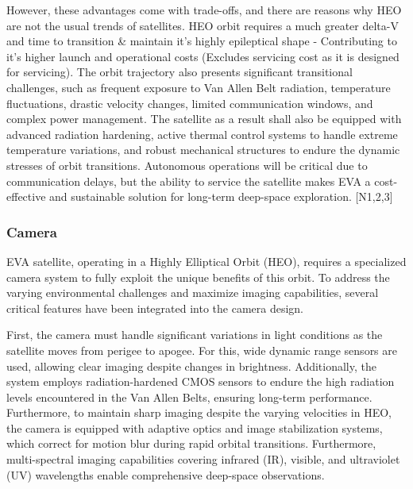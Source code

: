However, these advantages come with trade-offs, and there are reasons why HEO are not the usual trends of satellites. HEO orbit requires a much greater delta-V and time to transition \& maintain it's highly epileptical shape - Contributing to it's higher launch and operational costs (Excludes servicing cost as it is designed for servicing). The orbit trajectory also presents significant transitional challenges, such as frequent exposure to Van Allen Belt radiation, temperature fluctuations, drastic velocity changes, limited communication windows, and complex power management. The satellite as a result shall also be equipped with advanced radiation hardening, active thermal control systems to handle extreme temperature variations, and robust mechanical structures to endure the dynamic stresses of orbit transitions. Autonomous operations will be critical due to communication delays, but the ability to service the satellite makes EVA a cost-effective and sustainable solution for long-term deep-space exploration.
[N1,2,3]
\subsubsection{Camera}

\vspace{1.5mm}

EVA satellite, operating in a Highly Elliptical Orbit (HEO), requires a specialized camera system to fully exploit the unique benefits of this orbit. To address the varying environmental challenges and maximize imaging capabilities, several critical features have been integrated into the camera design.

\vspace{1.5mm}

First, the camera must handle significant variations in light conditions as the satellite moves from perigee to apogee. For this, wide dynamic range sensors are used, allowing clear imaging despite changes in brightness. Additionally, the system employs radiation-hardened CMOS sensors to endure the high radiation levels encountered in the Van Allen Belts, ensuring long-term performance. Furthermore, to maintain sharp imaging despite the varying velocities in HEO, the camera is equipped with adaptive optics and image stabilization systems, which correct for motion blur during rapid orbital transitions. Furthermore, multi-spectral imaging capabilities covering infrared (IR), visible, and ultraviolet (UV) wavelengths enable comprehensive deep-space observations.


